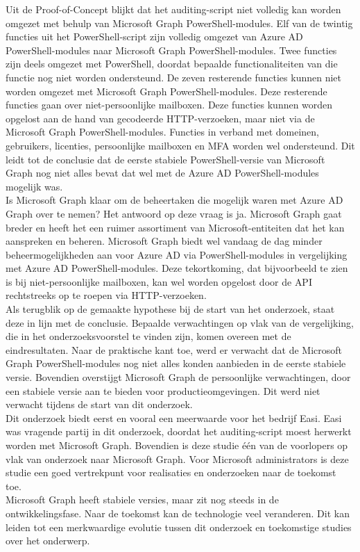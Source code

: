 Uit de Proof-of-Concept blijkt dat het auditing-script niet volledig kan worden omgezet met behulp van Microsoft Graph PowerShell-modules. Elf van de twintig functies uit het PowerShell-script zijn volledig omgezet van Azure \Ac{AD} PowerShell-modules naar Microsoft Graph PowerShell-modules. Twee functies zijn deels omgezet met PowerShell, doordat bepaalde functionaliteiten van die functie nog niet worden ondersteund. De zeven resterende functies kunnen niet worden omgezet met Microsoft Graph PowerShell-modules. Deze resterende functies gaan over niet-persoonlijke mailboxen. Deze functies kunnen worden opgelost aan de hand van gecodeerde \ac{HTTP}-verzoeken, maar niet via de Microsoft Graph PowerShell-modules. Functies in verband met domeinen, gebruikers, licenties, persoonlijke mailboxen en \Ac{MFA} worden wel ondersteund. Dit leidt tot de conclusie dat de eerste stabiele PowerShell-versie van Microsoft Graph nog niet alles bevat dat wel met de Azure \Ac{AD} PowerShell-modules mogelijk was. \\ 

Is Microsoft Graph klaar om de beheertaken die mogelijk waren met Azure \Ac{AD} Graph over te nemen? Het antwoord op deze vraag is ja. Microsoft Graph gaat 
breder en heeft het een ruimer assortiment van Microsoft-entiteiten dat het kan aanspreken en beheren. Microsoft Graph biedt wel vandaag de dag minder beheermogelijkheden aan voor Azure \ac{AD} via PowerShell-modules in vergelijking met Azure \Ac{AD} PowerShell-modules. Deze tekortkoming, dat bijvoorbeeld te zien is bij niet-persoonlijke mailboxen, kan wel worden opgelost door de \Ac{API} rechtstreeks op te roepen via \ac{HTTP}-verzoeken. \\

Als terugblik op de gemaakte hypothese bij de start van het onderzoek, staat deze in lijn met de conclusie. Bepaalde verwachtingen op vlak van de vergelijking, die in het onderzoeksvoorstel te vinden zijn, komen overeen met de eindresultaten. Naar de praktische kant toe, werd er verwacht dat de Microsoft Graph PowerShell-modules nog niet alles konden aanbieden in de eerste stabiele versie. Bovendien overstijgt Microsoft Graph de persoonlijke verwachtingen, door een stabiele versie aan te bieden voor productieomgevingen. Dit werd niet verwacht tijdens de start van dit onderzoek. \\

Dit onderzoek biedt eerst en vooral een meerwaarde voor het bedrijf Easi. Easi was vragende partij in dit onderzoek, doordat het auditing-script moest herwerkt worden met Microsoft Graph. Bovendien is deze studie één van de voorlopers op vlak van onderzoek naar Microsoft Graph. Voor Microsoft administrators is deze studie een goed vertrekpunt voor realisaties en onderzoeken naar de toekomst toe. \\

Microsoft Graph heeft stabiele versies, maar zit nog steeds in de ontwikkelingsfase. Naar de toekomst kan de technologie veel veranderen. Dit kan leiden tot een merkwaardige evolutie tussen dit onderzoek en toekomstige studies over het onderwerp. 
 

